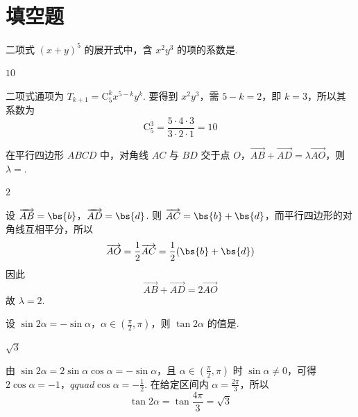 \section{填空题}

\begin{problem}
二项式 \((x + y)^5\) 的展开式中，含 \(x^2 y^3\) 的项的系数是\fillinblank{}.
\end{problem}

\begin{answer}
\(10\)
\end{answer}

\begin{solution}
二项式通项为 \(T_{k+1}=\mathrm C_5^k x^{5-k}y^k\). 要得到 \(x^2y^3\)，需 \(5-k=2\)，即 \(k=3\)，所以其系数为
\[
\mathrm C_5^3=\frac{5\cdot4\cdot3}{3\cdot2\cdot1}=10
\]
\end{solution}

\begin{problem}
在平行四边形 \(ABCD\) 中，对角线 \(AC\) 与 \(BD\) 交于点 \(O\)，\(\overrightarrow{AB} + \overrightarrow{AD} = \lambda \overrightarrow{AO}\)，则 \(\lambda =\)\fillinblank{}.
\end{problem}

\begin{answer}
\(2\)
\end{answer}

\begin{solution}
设 \(\overrightarrow{AB}=\bs{b}\)，\(\overrightarrow{AD}=\bs{d}\). 则
\(\overrightarrow{AC}=\bs{b}+\bs{d}\)，而平行四边形的对角线互相平分，所以
\[
\overrightarrow{AO}=\frac12\overrightarrow{AC}=\frac12(\bs{b}+\bs{d})
\]
因此
\[
\overrightarrow{AB}+\overrightarrow{AD}=2\overrightarrow{AO}
\]
故 \(\lambda=2\).
\end{solution}

\begin{problem}
设 \(\sin 2\alpha = -\sin \alpha\)，\(\alpha \in \left(\frac{\pi}{2}, \pi\right)\)，则 \(\tan 2\alpha\) 的值是\fillinblank{}.
\end{problem}

\begin{answer}
\(\sqrt{3}\)
\end{answer}

\begin{solution}
由 \(\sin2\alpha=2\sin\alpha\cos\alpha=-\sin\alpha\)，且
\(\alpha\in(\frac\pi2,\pi)\) 时 \(\sin\alpha\ne0\)，可得
\(2\cos\alpha=-1\)，\(qquad \cos\alpha=-\frac12\).
在给定区间内 \(\alpha=\frac{2\pi}{3}\)，所以
\[
\tan2\alpha=\tan\frac{4\pi}{3}=\sqrt3
\]
\end{solution}

